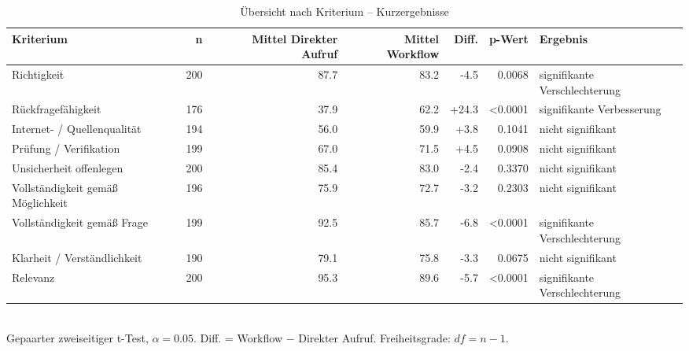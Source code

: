 \begin{table}[htbp]
\centering
\caption{Übersicht nach Kriterium -- Kurzergebnisse}
\begin{tabular}{lrrrrrl}
\toprule
Kriterium & n & Mittel Direkter Aufruf & Mittel Workflow & Diff. & p-Wert & Ergebnis \\
\midrule
Richtigkeit & 200 & 87.7 & 83.2 & -4.5 & 0.0068 & signifikante Verschlechterung \\
Rückfragefähigkeit & 176 & 37.9 & 62.2 & +24.3 & <0.0001 & signifikante Verbesserung \\
Internet- / Quellenqualität & 194 & 56.0 & 59.9 & +3.8 & 0.1041 & nicht signifikant \\
Prüfung / Verifikation & 199 & 67.0 & 71.5 & +4.5 & 0.0908 & nicht signifikant \\
Unsicherheit offenlegen & 200 & 85.4 & 83.0 & -2.4 & 0.3370 & nicht signifikant \\
Vollständigkeit gemäß Möglichkeit & 196 & 75.9 & 72.7 & -3.2 & 0.2303 & nicht signifikant \\
Vollständigkeit gemäß Frage & 199 & 92.5 & 85.7 & -6.8 & <0.0001 & signifikante Verschlechterung \\
Klarheit / Verständlichkeit & 190 & 79.1 & 75.8 & -3.3 & 0.0675 & nicht signifikant \\
Relevanz & 200 & 95.3 & 89.6 & -5.7 & <0.0001 & signifikante Verschlechterung \\
\bottomrule
\end{tabular}
\\[2mm]
\footnotesize Gepaarter zweiseitiger t-Test, $\alpha=0.05$. Diff. = Workflow $-$ Direkter Aufruf. Freiheitsgrade: $df=n-1$.
\end{table}
